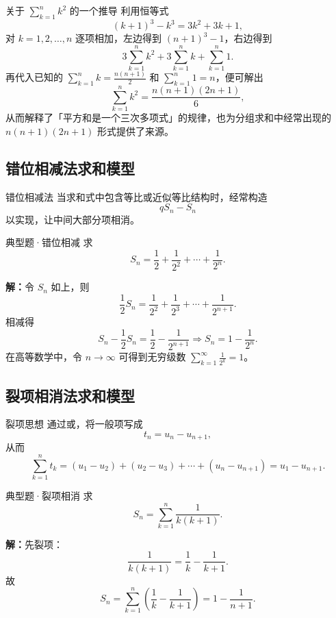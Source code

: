 \documentclass[a4paper,11pt]{ctexart}
\begin{document}
\begin{sideinfobox}{关于 $\sum_{k=1}^n k^2$ 的一个推导}
  利用恒等式
  \[
    (k+1)^3-k^3=3k^2+3k+1,
  \]
  对 $k=1,2,\dots,n$ 逐项相加，左边得到 $(n+1)^3-1$，右边得到
  \[
    3\sum_{k=1}^n k^2+3\sum_{k=1}^n k+\sum_{k=1}^n1.
  \]
  再代入已知的 $\displaystyle\sum_{k=1}^n k=\frac{n(n+1)}{2}$ 和 $\sum_{k=1}^n1=n$，便可解出
  \[
    \sum_{k=1}^n k^2=\frac{n(n+1)(2n+1)}{6},
  \]
  从而解释了「平方和是一个三次多项式」的规律，也为分组求和中经常出现的 $n(n+1)(2n+1)$ 形式提供了来源。
\end{sideinfobox}

\subsection{错位相减法求和模型}

\begin{definitionbox}{错位相减法}
  当求和式中包含等比或近似等比结构时，经常构造
  \[
    qS_n-S_n
  \]
  以实现，让中间大部分项相消。
\end{definitionbox}

\begin{examplebox}{典型题·错位相减}
  求
  \[
    S_n=\frac{1}{2}+\frac{1}{2^2}+\cdots+\frac{1}{2^n}.
  \]

  \textbf{解：}令 $S_n$ 如上，则
  \[
    \frac{1}{2}S_n=\frac{1}{2^2}+\frac{1}{2^3}+\cdots+\frac{1}{2^{n+1}}.
  \]
  相减得
  \[
    S_n-\frac{1}{2}S_n=\frac{1}{2}-\frac{1}{2^{n+1}}
    \Rightarrow S_n=1-\frac{1}{2^{n}}.
  \]
  在高等数学中，令 $n\to\infty$ 可得到无穷级数 $\sum_{k=1}^{\infty}\frac{1}{2^k}=1$。
\end{examplebox}

\subsection{裂项相消法求和模型}

\begin{definitionbox}{裂项思想}
  通过或，将一般项写成
  \[
    t_n=u_n-u_{n+1},
  \]
  从而
  \[
    \sum_{k=1}^{n}t_k=(u_1-u_2)+(u_2-u_3)+\cdots+(u_n-u_{n+1})=u_1-u_{n+1}.
  \]
\end{definitionbox}

\begin{examplebox}{典型题·裂项相消}
  求
  \[
    S_n=\sum_{k=1}^n\frac{1}{k(k+1)}.
  \]

  \textbf{解：}先裂项：
  \[
    \frac{1}{k(k+1)}=\frac{1}{k}-\frac{1}{k+1}.
  \]
  故
  \[
    S_n=\sum_{k=1}^n\left(\frac{1}{k}-\frac{1}{k+1}\right)=1-\frac{1}{n+1}.
  \]
\end{examplebox}
\end{document}
